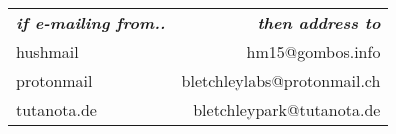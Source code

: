 \documentclass[12pt]{scrartcl}
\makeatletter
\newcommand{\uidhm}{{\Fontlukas hm}15}
\newcommand{\uidpm}{\Fontlukas bletchleylabs}
\newcommand{\uidtn}{\Fontlukas bletchleypark}
\newcommand{\dnhm}{\wela @gombos.info}
\newcommand{\dnpm}{\wela @protonmail.ch}
\newcommand{\dntn}{\wela @tutanota.de}
\makeatother
\begin{document}
\begin{preview}
\fontsize{0.75cm}{0.8cm}\selectfont
\begin{minipage}{6cm} %
  \begin{tabular}{lr}
    \textsl{\textbf{if e-mailing from..}} & \textsl{\textbf{then address to}}\\
    hushmail                              & \uidhm\dnhm\\
    protonmail                            & \uidpm\dnpm\\
    tutanota.de                           & \uidtn\dntn\\
  \end{tabular}
\end{minipage}
\end{preview}
\end{document}
